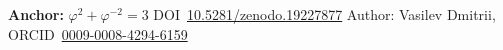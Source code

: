 
\vspace{2em}
\begin{center}
\textbf{Anchor:} \(\varphi^{2}+\varphi^{-2}=3\) \quad
DOI~\href{https://doi.org/10.5281/zenodo.19227877}{10.5281/zenodo.19227877} \quad
Author: Vasilev Dmitrii, ORCID~\href{https://orcid.org/0009-0008-4294-6159}{0009-0008-4294-6159}
\end{center}
